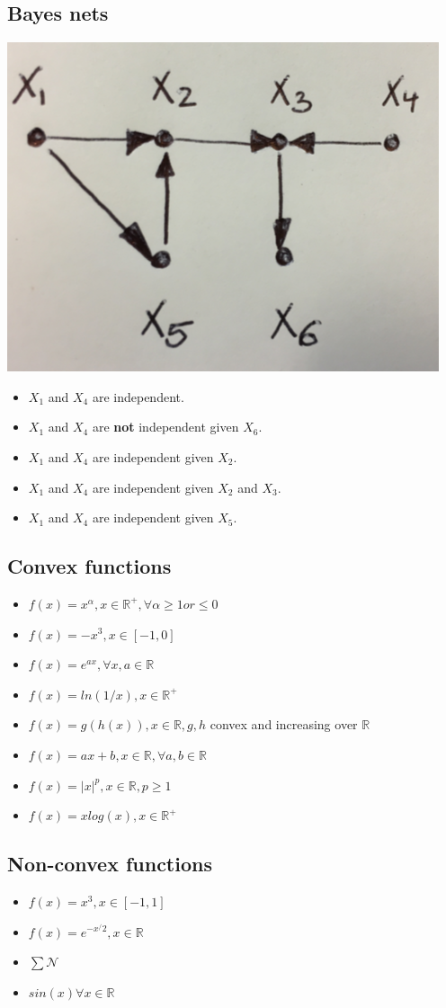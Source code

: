 \subsection{Bayes nets}
\includegraphics[width=0.5\linewidth]{figs/bayesnet.png}
\begin{itemize}
\item $X_1$ and $X_4$ are independent.
\item $X_1$ and $X_4$ are \textbf{not} independent given $X_6$.
\item $X_1$ and $X_4$ are independent given $X_2$.
\item $X_1$ and $X_4$ are independent given $X_2$ and $X_3$.
\item $X_1$ and $X_4$ are independent given $X_5$.
\end{itemize}

\subsection{Convex functions}
\begin{itemize}
\item $f(x) = x^{\alpha}, x \in \mathbb{R^+}, \forall \alpha \ge 1 or \le 0$
\item $f(x) = -x^3, x \in [-1,0]$
\item $f(x) = e^{ax}, \forall x,a \in \mathbb{R}$
\item $f(x) = ln(1/x), x \in \mathbb{R^+}$
\item $f(x) = g(h(x)), x \in \mathbb{R}, g,h$ convex and increasing over $\mathbb{R}$
\item $f(x) = ax+b, x \in \mathbb{R}, \forall a,b \in \mathbb{R}$
\item $f(x) = |x|^p, x \in \mathbb{R}, p\ge 1$
\item $f(x) = xlog(x), x \in \mathbb{R}^+$
\end{itemize}

\subsection{Non-convex functions}
\begin{itemize}
\item $f(x) = x^3, x \in [-1,1]$
\item $f(x) = e^{-x^/2}, x \in \mathbb{R}$
\item $\sum \mathcal{N}$
\item $sin(x) \forall x \in \mathbb{R}$
\end{itemize}
